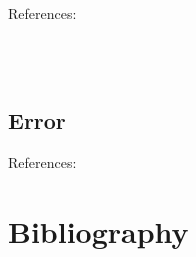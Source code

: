 \documentclass[11pt,twoside]{article}
\begin{document}
\begin{appendices}
References:

\noindent
\cite{schwarz_is_2009}\\
\cite{toomela_variables_2008}\\
\cite{stam_fault_2010}

\subsection{Error}

References:

\noindent
\cite{smith_refining_2011}

\section{Bibliography}
\printbibliography[heading=none]
\end{appendices}
\end{document}
